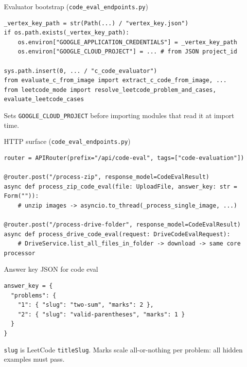 \documentclass[aspectratio=169]{beamer}
\begin{document}
\begin{frame}[fragile]{Evaluator bootstrap (\texttt{code\_eval\_endpoints.py})}
\begin{lstlisting}[style=py]
_vertex_key_path = str(Path(...) / "vertex_key.json")
if os.path.exists(_vertex_key_path):
    os.environ["GOOGLE_APPLICATION_CREDENTIALS"] = _vertex_key_path
    os.environ["GOOGLE_CLOUD_PROJECT"] = ... # from JSON project_id

sys.path.insert(0, ... / "c_code_evaluator")
from evaluate_c_from_image import extract_c_code_from_image, ...
from leetcode_mode import resolve_leetcode_problem_and_cases, evaluate_leetcode_cases
\end{lstlisting}
\vfill
\tiny Sets \texttt{GOOGLE\_CLOUD\_PROJECT} before importing modules that read it at import time.
\end{frame}

\begin{frame}[fragile]{HTTP surface (\texttt{code\_eval\_endpoints.py})}
\begin{lstlisting}[style=py]
router = APIRouter(prefix="/api/code-eval", tags=["code-evaluation"])

@router.post("/process-zip", response_model=CodeEvalResult)
async def process_zip_code_eval(file: UploadFile, answer_key: str = Form("")):
    # unzip images -> asyncio.to_thread(_process_single_image, ...)

@router.post("/process-drive-folder", response_model=CodeEvalResult)
async def process_drive_code_eval(request: DriveCodeEvalRequest):
    # DriveService.list_all_files_in_folder -> download -> same core processor
\end{lstlisting}
\end{frame}

\begin{frame}[fragile]{Answer key JSON for code eval}
\begin{lstlisting}[style=pys]
answer_key = {
  "problems": {
    "1": { "slug": "two-sum", "marks": 2 },
    "2": { "slug": "valid-parentheses", "marks": 1 }
  }
}
\end{lstlisting}
\vfill
\tiny \texttt{slug} is LeetCode \texttt{titleSlug}. Marks scale all-or-nothing per problem: all hidden examples must pass.
\end{frame}
\end{document}
